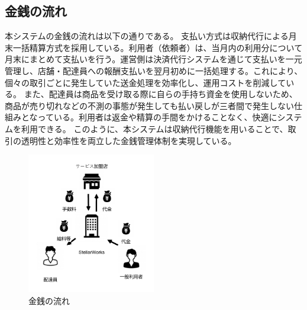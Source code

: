 \subsection{金銭の流れ}
本システムの金銭の流れは以下の通りである。
支払い方式は収納代行による月末一括精算方式を採用している。利用者（依頼者）は、当月内の利用分について月末にまとめて支払いを行う。運営側は決済代行システムを通じて支払いを一元管理し、店舗・配達員への報酬支払いを翌月初めに一括処理する。これにより、個々の取引ごとに発生していた送金処理を効率化し、運用コストを削減している。
また、配達員は商品を受け取る際に自らの手持ち資金を使用しないため、商品が売り切れなどの不測の事態が発生しても払い戻しが三者間で発生しない仕組みとなっている。利用者は返金や精算の手間をかけることなく、快適にシステムを利用できる。
このように、本システムは収納代行機能を用いることで、取引の透明性と効率性を両立した金銭管理体制を実現している。
\begin{figure}[H]
  \centering
  \includegraphics[width=0.5\textwidth]{お金の流れ1.pdf}
  \caption{金銭の流れ}
  \label{money}
\end{figure}
